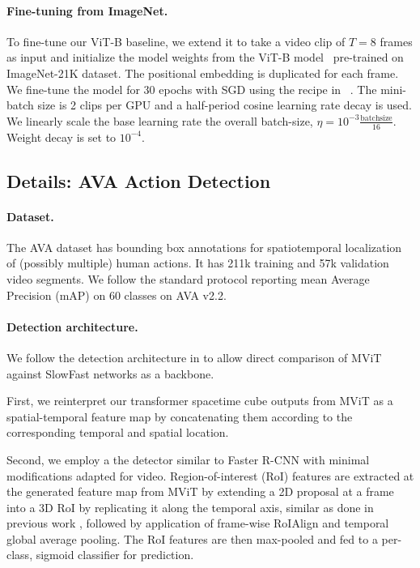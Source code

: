 \documentclass[10pt,twocolumn,letterpaper]{article}
\begin{document}
\paragraph{Fine-tuning from ImageNet.} 

To fine-tune our ViT-B baseline, we extend it to take a video clip of $T=8$ frames as input and initialize the model weights from the ViT-B model~\cite{dosovitskiy2020image} pre-trained on ImageNet-21K dataset. The positional embedding is duplicated for each frame. We fine-tune the model for 30 epochs with SGD using the recipe in ~\cite{Feichtenhofer2019}. 
The mini-batch size is 2 clips per GPU and a half-period cosine learning rate decay is used. We linearly scale the base learning rate \wrt the overall batch-size, $\eta =10^{-3}\frac{\mathrm{batchsize}}{16}$. Weight decay is set to $10^{-4}$.

\subsection{Details: AVA Action Detection}\label{sec:detection}


\paragraph{Dataset.}
The AVA dataset \cite{Gu2018} has bounding box annotations for spatiotemporal localization of (possibly multiple) human actions. It has 211k training and 57k validation video segments. We follow the standard protocol reporting mean Average Precision (mAP) on 60 classes \cite{Gu2018} on AVA v2.2.

\paragraph{Detection architecture.}
We follow the detection architecture in \cite{Feichtenhofer2019} to allow direct comparison of MViT against \mbox{SlowFast} networks as a backbone.

First, we reinterpret our transformer spacetime cube outputs from MViT as a spatial-temporal feature map by concatenating them according to the corresponding temporal and spatial location. 

Second, we employ a the detector similar to Faster R-CNN \cite{Ren2015} with minimal modifications adapted for video. 
Region-of-interest (RoI) features \cite{Girshick2015} are extracted at the generated feature map from MViT by extending a 2D proposal at a frame into a 3D RoI by replicating it along the temporal axis, similar as done in previous work \cite{Gu2018,Sun2018,Jiang2018}, followed by application of frame-wise RoIAlign \cite{He2017} and temporal global average pooling. The RoI features are then max-pooled and fed to a per-class, sigmoid classifier for prediction. 
\end{document}
